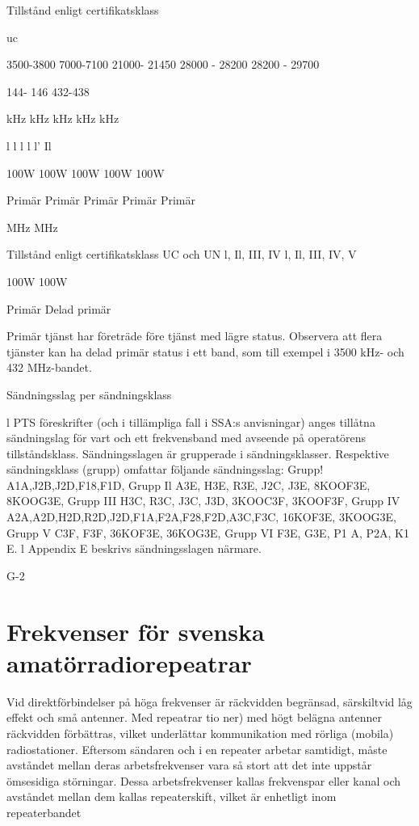\documentclass[a4paper,twoside,twocolumn,openright]{book}
\begin{document}
{{{{{{{{{{{Tillstånd enligt
certifikatsklass

uc

3500-3800
7000-7100
21000- 21450
28000 - 28200
28200 - 29700

144- 146
432-438

kHz
kHz
kHz
kHz
kHz

l
l
l
l
l' Il

100W
100W
100W
100W
100W

Primär
Primär
Primär
Primär
Primär

MHz
MHz

Tillstånd enligt
certifikatsklass
UC och UN
l, Il, III, IV
l, Il, III, IV, V

100W
100W

Primär
Delad primär

Primär tjänst har företräde före tjänst med lägre status. Observera att flera tjänster kan ha
delad primär status i ett band, som till exempel i 3500 kHz- och 432 MHz-bandet.

Sändningsslag per sändningsklass

l PTS föreskrifter (och i tillämpliga fall i SSA:s anvisningar) anges tillåtna sändningslag för
vart och ett frekvensband med avseende på operatörens tillståndsklass. Sändningsslagen
är grupperade i sändningsklasser.
Respektive sändningsklass (grupp) omfattar följande sändningsslag:
Grupp!
A1A,J2B,J2D,F18,F1D,
Grupp Il
A3E, H3E, R3E, J2C, J3E, 8KOOF3E, 8KOOG3E,
Grupp III
H3C, R3C, J3C, J3D, 3KOOC3F, 3KOOF3F,
Grupp IV
A2A,A2D,H2D,R2D,J2D,F1A,F2A,F28,F2D,A3C,F3C, 16KOF3E,
3KOOG3E,
Grupp V
C3F, F3F, 36KOF3E, 36KOG3E,
Grupp VI
F3E, G3E, P1 A, P2A, K1 E.
l Appendix E beskrivs sändningsslagen närmare.

G-2

\chapter{Frekvenser för svenska amatörradiorepeatrar}
Vid direktförbindelser på höga frekvenser är
räckvidden begränsad, särskiltvid låg effekt
och små antenner. Med repeatrar
tio ner) med högt belägna antenner
räckvidden förbättras, vilket underlättar kommunikation med rörliga (mobila) radiostationer.
Eftersom sändaren och
i en
repeater arbetar samtidigt, måste avståndet
mellan deras arbetsfrekvenser vara så stort
att det inte uppstår ömsesidiga störningar.
Dessa arbetsfrekvenser kallas frekvenspar eller kanal och avståndet mellan dem
kallas repeaterskift, vilket är enhetligt inom
repeaterbandet

}}}}}}}}}}}
\end{document}
